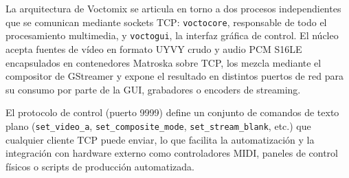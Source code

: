 La arquitectura de Voctomix se articula en torno a dos procesos independientes que
se comunican mediante sockets TCP: \texttt{voctocore}, responsable de todo el
procesamiento multimedia, y \texttt{voctogui}, la interfaz gráfica de control.
El núcleo acepta fuentes de vídeo en formato UYVY crudo y audio PCM S16LE
encapsulados en contenedores Matroska sobre TCP, los mezcla mediante el compositor
de GStreamer y expone el resultado en distintos puertos de red para su consumo por
parte de la GUI, grabadores o encoders de streaming.

El protocolo de control (puerto 9999) define un conjunto de comandos de texto plano
(\texttt{set\_video\_a}, \texttt{set\_composite\_mode}, \texttt{set\_stream\_blank}, etc.)
que cualquier cliente TCP puede enviar, lo que facilita la automatización y la integración
con hardware externo como controladores MIDI, paneles de control físicos o scripts de
producción automatizada.

